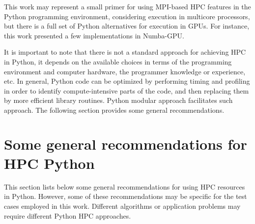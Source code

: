 This work may represent a small primer for using MPI-based HPC features in the Python programming environment, considering execution in multicore processors, but there is a full set of Python alternatives for execution in GPUs. For instance, this work presented a few implementations in Numba-GPU. 

It is important to note that there is not a standard approach for achieving HPC in Python, it depends on the available choices in terms of the programming environment and computer hardware, the programmer knowledge or experience, etc. In general, Python code can be optimized by performing timing and profiling in order to identify compute-intensive parts of the code, and then replacing them by more efficient library routines. Python modular approach facilitates such approach. The following section provides some general recommendations. 

%
%
%
\section{Some general recommendations for HPC Python}
\label{sec_analalt}

This section lists below some general recommendations for using HPC resources in Python. However, some of these recommendations may be specific for the test cases employed in this work. Different algorithms or application problems may require different Python HPC approaches. 

